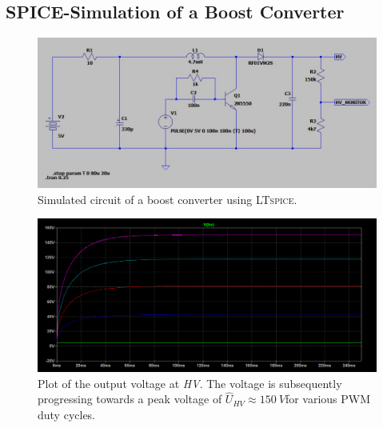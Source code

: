     \subsection*{SPICE-Simulation of a Boost Converter}
    \begin{figure}[h]
        \centering
        \includegraphics[width=\textwidth]{Spice/circuit.jpg}
        \caption[Simulated circuit of a boost converter.]{Simulated circuit of a boost converter using \textsc{LTspice}.}
        \label{fig:simCircuit}
    \end{figure}
    \begin{figure}[h]
        \centering\includegraphics[width=\textwidth]{Spice/plot.jpg}
        \caption{Plot of the output voltage at \textit{HV}. The voltage is subsequently progressing towards a peak voltage of \( \hat{U}_{HV} \approx \SI[]{150}[]{V} \)for various PWM duty cycles.}
        \label{fig:plotSimCircuit}
    \end{figure}
